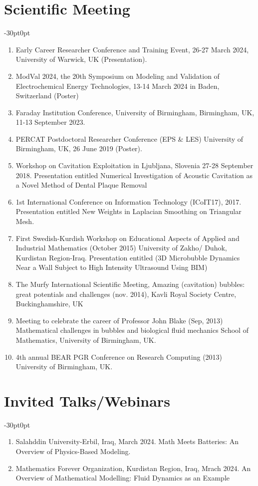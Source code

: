 \documentclass[line]{res}
\newenvironment{p1}
{\begin{adjustwidth}{-30pt}{0pt}
\vspace{8pt}}
{\end{adjustwidth}}
\begin{document}
\begin{resume}
\section{Scientific Meeting}
\begin{p1}
	\begin{enumerate}
		\item Early Career Researcher Conference and Training Event, 26-27 March 2024, University of Warwick, UK (Presentation).
		\item ModVal 2024, the 20th Symposium on Modeling and Validation of Electrochemical Energy Technologies, 13-14 March 2024 in Baden, Switzerland (Poster)
		\item Faraday Institution Conference, University of Birmingham, Birmingham, UK, 11-13 September 2023.
		\item PERCAT Postdoctoral Researcher Conference (EPS \& LES) University of Birmingham, UK, 26 June 2019 (Poster).
		\item Workshop on Cavitation Exploitation in Ljubljana, Slovenia 27-28 September 2018. Presentation entitled Numerical Investigation of Acoustic Cavitation as a Novel Method of Dental Plaque Removal 
		\item 1st International Conference on Information Technology (ICoIT17), 2017. Presentation entitled New Weights in Laplacian Smoothing on Triangular Mesh.
		\item First Swedish-Kurdish Workshop on Educational Aspects of Applied and Industrial Mathematics (October 2015) University of Zakho/ Duhok, Kurdistan Region-Iraq. Presentation entitled (3D Microbubble Dynamics Near a Wall Subject to High Intensity Ultrasound Using BIM) 
		\item The Murfy International Scientific Meeting, Amazing (cavitation) bubbles: great potentials and challenges (nov. 2014), Kavli Royal Society Centre, Buckinghamshire, UK
		\item Meeting to celebrate the career of Professor John Blake (Sep, 2013) Mathematical challenges in bubbles and biological fluid mechanics School of Mathematics, University of Birmingham, UK.
		\item 4th annual BEAR PGR Conference on Research Computing (2013) University of Birmingham, UK.
	\end{enumerate}
	\end{p1}


	\section{Invited Talks/Webinars}
	\begin{p1}
		\begin{enumerate}
			\item Salahddin University-Erbil, Iraq, March 2024. Math Meets Batteries: An Overview of Physics-Based Modeling.
			\item Mathematics Forever Organization, Kurdistan Region, Iraq, Mrach 2024. An Overview of Mathematical Modelling: Fluid Dynamics as an Example
			

\end{enumerate}
\end{p1}
\end{resume}
\end{document}
